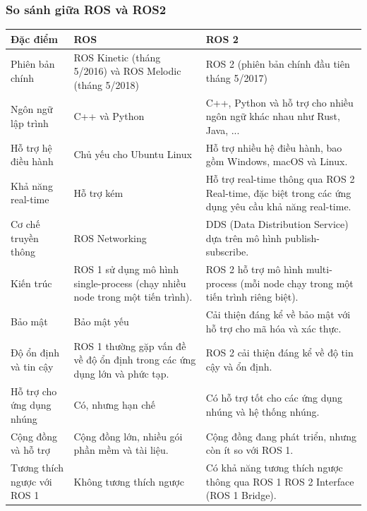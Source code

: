 \subsubsection*{So sánh giữa \textbf{ROS} và \textbf{ROS2}}
\begin{center}
\begin{tabular}{|p{4.5cm}|p{4.5cm}|p{4.5cm}|}
\hline
\textbf{Đặc điểm} & \textbf{ROS} & \textbf{ROS 2} \\
\hline
Phiên bản chính & ROS Kinetic (tháng 5/2016) và ROS Melodic (tháng 5/2018) & ROS 2 (phiên bản chính đầu tiên tháng 5/2017) \\
\hline
Ngôn ngữ lập trình & C++ và Python & C++, Python và hỗ trợ cho nhiều ngôn ngữ khác nhau như Rust, Java, ... \\
\hline
Hỗ trợ hệ điều hành & Chủ yếu cho Ubuntu Linux & Hỗ trợ nhiều hệ điều hành, bao gồm Windows, macOS và Linux. \\
\hline
Khả năng real-time & Hỗ trợ kém & Hỗ trợ real-time thông qua ROS 2 Real-time, đặc biệt trong các ứng dụng yêu cầu khả năng real-time. \\
\hline
Cơ chế truyền thông & ROS Networking & DDS (Data Distribution Service) dựa trên mô hình publish-subscribe. \\
\hline
Kiến trúc & ROS 1 sử dụng mô hình single-process (chạy nhiều node trong một tiến trình). & ROS 2 hỗ trợ mô hình multi-process (mỗi node chạy trong một tiến trình riêng biệt). \\
\hline
Bảo mật & Bảo mật yếu & Cải thiện đáng kể về bảo mật với hỗ trợ cho mã hóa và xác thực. \\
\hline
Độ ổn định và tin cậy & ROS 1 thường gặp vấn đề về độ ổn định trong các ứng dụng lớn và phức tạp. & ROS 2 cải thiện đáng kể về độ tin cậy và ổn định. \\
\hline
Hỗ trợ cho ứng dụng nhúng & Có, nhưng hạn chế & Có hỗ trợ tốt cho các ứng dụng nhúng và hệ thống nhúng. \\
\hline
Cộng đồng và hỗ trợ & Cộng đồng lớn, nhiều gói phần mềm và tài liệu. & Cộng đồng đang phát triển, nhưng còn ít so với ROS 1. \\
\hline
Tương thích ngược với ROS 1 & Không tương thích ngược & Có khả năng tương thích ngược thông qua ROS 1 ROS 2 Interface (ROS 1 Bridge). \\
\hline
\end{tabular}
\end{center}

